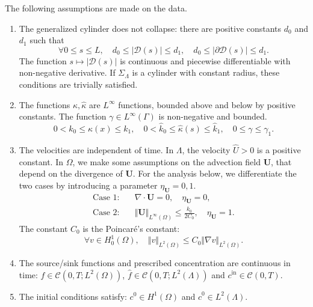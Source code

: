 \documentclass[pdflatex,sn-mathphys-num]{sn-jnl}%
\newcommand{\bfU}{{\boldsymbol U}}
\theoremstyle{thmstyleone}%
\theoremstyle{thmstyletwo}%
\theoremstyle{thmstylethree}%
\begin{document}
The following assumptions are made on the data.
\begin{enumerate}
    \item[(i)] The generalized cylinder does not collapse: there are positive constants $d_0$ and $d_1$ such that
\begin{equation}\label{eq:Dbounded}
    \forall 0\leq s \leq L, \quad
    d_0 \leq \vert \mathcal{D}(s) \vert \leq d_1, \quad
    d_0 \leq \vert \partial\mathcal{D}(s) \vert \leq d_1.
    \end{equation}
    The function $s\mapsto \vert \mathcal{D}(s)\vert $ is continuous and piecewise differentiable with non-negative derivative.
    If $\Sigma_\Lambda$ is a cylinder with  constant radius, these conditions are trivially satisfied.
    \item[(ii)] The functions $\kappa, \hat \kappa$ are $L^\infty$ functions, bounded above and below by positive constants. The function $\gamma\in L^\infty(\Gamma)$ is non-negative and bounded.
    \[
    0< k_0 \leq \kappa(x) \leq k_1, \quad
    0< \hat k_0 \leq \hat \kappa (s) \leq \hat k_1, \quad
    0\leq \gamma \leq \gamma_1.
    \]
    \item[(iii)] The velocities are independent of time. In $\Lambda$, the velocity $\hat U>0$ is a positive constant. In $\Omega$, we make some assumptions on  the advection field $\bfU$, that depend on the divergence of $\bfU$.  For the analysis below, we differentiate the two cases by introducing a parameter $\eta_\bfU = 0,1$. 
    \begin{align}
    \mbox{Case 1:}&\quad \nabla \cdot \bfU = 0, \quad \eta_\bfU = 0,\\
    \mbox{Case 2:}&\quad \Vert \bfU \Vert_{L^\infty(\Omega)} \leq \frac{k_0}{2 C_0}, \quad \eta_\bfU = 1.\label{eq:condU}
    \end{align}
    The constant $C_0$ is the Poincar\'e's constant:
    \begin{equation}
\label{eq:poincare}
\forall v\in H^1_0(\Omega), \quad 
\Vert v \Vert_{L^2(\Omega)} \leq C_0 \Vert \nabla v \Vert_{L^2(\Omega)}.
\end{equation}
    \item[(iv)] The source/sink functions  and prescribed concentration are continuous in time: $f\in \mathcal{C}(0,T;L^2(\Omega))$, $\hat f \in \mathcal{C}(0,T;L^2(\Lambda))$ and $c^\mathrm{in}\in \mathcal{C}(0,T)$.
    \item[(v)] The initial conditions satisfy:  $c^0 \in H^1(\Omega)$   and $\hat c^0 \in L^2(\Lambda)$.
\end{enumerate}
\end{document}
